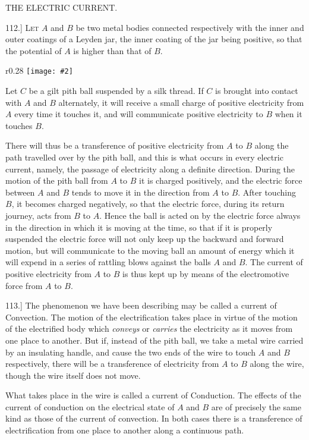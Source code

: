 \documentclass[12pt,oneside]{book}[2021/10/04]
\newcommand{\Runhead}[1]{\fancyhead[C]{\iffloatpage{}{\small#1}}}
\newcommand{\Subheading}[1]{\begin{center}\small #1 \end{center}}
\newcommand{\article}[1]{\phantomsection \label{art:#1}{#1.]}}
\newcommand{\wrapfig}[3]{
\begin{wrapfigure}{r}{#1\textwidth}
\centering
\texttt{[image: \#2]}
\caption*{\small #3}
\end{wrapfigure}}
\newcommand{\¬}{\hphantom{0}}
\begin{document}
\Subheading{THE ELECTRIC CURRENT.}

\article{112} \textsc{Let} \(A\) and \(B\) be two metal bodies connected respectively
with the inner and outer coatings of a Leyden jar, the inner
coating of the jar being positive, so that the
potential of \(A\) is higher than that of \(B\).

\wrapfig{0.28}{114.png}{Fig. 28.}
Let \(C\) be a gilt pith ball suspended by a silk
thread. If \(C\) is brought into contact with \(A\) and
\(B\) alternately, it will receive a small charge of
positive electricity from \(A\) every time it touches
it, and will communicate positive electricity to \(B\)
when it touches \(B\).

There will thus be a transference of positive
electricity from \(A\) to \(B\) along the path travelled
over by the pith ball, and this is what occurs
in every electric current, namely, the passage of electricity along a
definite direction. During the motion of the pith ball from \(A\) to
\(B\) it is charged positively, and the electric force between \(A\) and
\(B\) tends to move it in the direction from \(A\) to \(B\). After touching
\(B\), it becomes charged negatively, so that the electric force, during
its return journey, acts from \(B\) to \(A\). Hence the ball is acted
on by the electric force always in the direction in which it is
moving at the time, so that if it is properly suspended the electric
force will not only keep up the backward and forward motion, but
will communicate to the moving ball an amount of energy which it
will expend in a series of rattling blows against the balls \(A\) and \(B\).
The current of positive electricity from \(A\) to \(B\) is thus kept up by
means of the electromotive force from \(A\) to \(B\).

\article{113} The phenomenon we have been describing may be called
a current of Convection. The motion of the electrification takes
place in virtue of the motion of the electrified body which \textit{conveys}
or \textit{carries} the electricity as it moves from one place to another.
But if, instead of the pith ball, we take a metal wire carried
by an insulating handle, and cause the two ends of the wire
to touch \(A\) and \(B\) respectively, there will be a transference of
electricity from \(A\) to \(B\) along the wire, though the wire itself does
not move.
\Runhead{CONVECTION AND CONDUCTION CURRENTS.}

What takes place in the wire is called a current of Conduction.
The effects of the current of conduction on the electrical state of
\(A\) and \(B\) are of precisely the same kind as those of the current of
convection. In both cases there is a transference of electrification
from one place to another along a continuous path.
\end{document}
